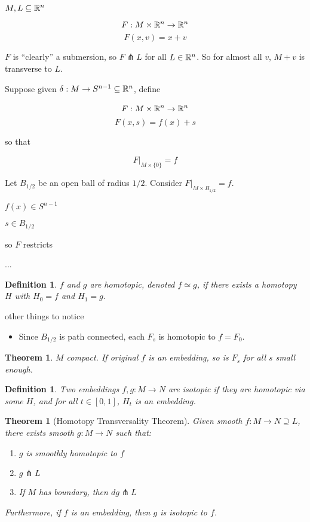 \documentclass[11pt]{amsbook}
\theoremstyle{mystyle} \newtheorem{thrm}[thm]{Theorem}
\theoremstyle{mystyle} \newtheorem{defi}[thm]{Definition}
\theoremstyle{mystyle} \newtheorem{coro}[thm]{Corollary}
\theoremstyle{mystyle} \newtheorem{propo}[thm]{Proposition}
\theoremstyle{mystyle} \newtheorem{lemm}[thm]{Lemma}
\numberwithin{thm}{section}
\newcommand{\homotopic}{\simeq}
\newcommand{\transverse}{\pitchfork}
\newcommand{\x}{\times}
\newcommand{\de}{\emph}
\begin{document}
\begin{example}
	$M, L \subseteq {\mathbb R}^n$

	$$F: M \x \R^n \to \R^n$$
	$$F(x,v) = x+v$$

	$F$ is ``clearly'' a submersion, so $F \transverse L$ for all $L \in {\mathbb R}^n$.  So for almost all $v$, $M+v$ is transverse to $L$.
\end{example}

\begin{example}
	Suppose given $\delta: M \to S^{n-1} \subseteq {\mathbb R}^n$, define

	$$\overset{~}{F}: M \x \R^n \to \R^n$$
	$$\overset{~}{F}(x,s) = f(x) + s$$

	so that

	$$\overset{~}{F}|_{M \x \{0\}} = f$$

	Let $B_{1/2}$ be an open ball of radius $1/2$.
	Consider $\overset{~}{F}|_{M \x B_{1/2}} = f$.

	$f(x) \in S^{n-1}$

	$s \in B_{1/2}$

	so $\overset{~}{F}$ restricts

	...




\begin{defi}
	$f$ and $g$ are \de{homotopic}, denoted $f \homotopic g$, if there exists a homotopy $H$ with $H_0 = f$ and $H_1 = g$.
\end{defi}
other things to notice
\begin{itemize}
	\item Since $B_{1/2}$ is path connected, each $F_s$ is homotopic to $f = F_0$.
\end{itemize}
\end{example}
\begin{thrm}
	$M$ compact.
	If original $f$ is an embedding, so is $F_s$ for all $s$ small enough.
\end{thrm}
\begin{defi}
	Two embeddings $f,g : M \to N$ are \de{isotopic} if they are homotopic via some $H$, and for all $t \in [0,1]$, $H_t$ is an embedding.
\end{defi}
\begin{thrm}[Homotopy Transversality Theorem]
	Given smooth $f: M \to N \supseteq L$, there exists smooth $g: M \to N$ such that:
	\begin{enumerate}
		\item $g$ is smoothly homotopic to $f$
		\item $g \transverse L$
		\item If $M$ has boundary, then $dg \transverse L$
	\end{enumerate}
	Furthermore, if $f$ is an embedding, then $g$ is isotopic to $f$.
\end{thrm}
\end{document}
